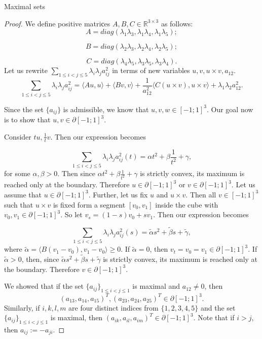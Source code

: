 \documentclass[12pt]{article}
\begin{document}
\begin{section}{Maximal sets}
\begin{proof}
         We define positive matriсes $A,B,C \in \mathbb{R}^{3\times 3}$ as follows:  
        $$
            A = diag(\lambda_{1}\lambda_{3}, \lambda_{1}\lambda_{4},\lambda_{1}\lambda_{5});
        $$ 
        
        $$
            B = diag(\lambda_{2}\lambda_{3}, \lambda_{2}\lambda_{4},\lambda_{2}\lambda_{5});
        $$
        
        $$ 
            C = diag(\lambda_{4}\lambda_{5}, \lambda_{3}\lambda_{5},\lambda_{3}\lambda_{4}).
        $$ 
        Let us rewrite $\sum_{1\leq i < j\leq 5}\lambda_{i}\lambda_{j} a_{ij}^{2}$ in terms of new variables $u,v,u\times v, a_{12}$.
        $$
            \sum_{1\leq i < j\leq 5}\lambda_{i}\lambda_{j} a_{ij}^{2} = \langle Au, u\rangle + \langle Bv, v\rangle + \frac{1}{a_{12}^2}\langle C (u\times v), u\times v\rangle + \lambda_{1}\lambda_{2}a_{12}^2.
        $$
    
        Since the set $\{a_{ij}\}$ is admissible, we know that $u,v,w \in [-1;1]^{3}.$ Our goal now is to show that $u,v \in \partial [-1;1]^{3}.$ 
    
        Consider $tu, \frac{1}{t}v$. Then our expression becomes
    
        $$
            \sum_{1\leq i < j\leq 5}\lambda_{i}\lambda_{j} a_{ij}^{2}(t) = \alpha t^2 + \beta \frac{1}{t^2} + \gamma,
        $$
        for some $\alpha, \beta > 0.$ Then since $\alpha t^2 + \beta \frac{1}{t^2} + \gamma$ is strictly convex, its maximum is reached only  at the boundary. Therefore $u \in \partial [-1;1]^{3}$ or $v \in \partial [-1;1]^{3}.$ Let us assume that $u\in\partial [-1;1]^{3}.$ Further, let us fix $u$ and $u\times v$. Then all $v\in [-1;1]^3$ such that $u\times v$ is fixed form a segment $[v_{0},v_{1}]$ inside the cube with $v_{0},v_{1}\in \partial[-1;1]^{3}.$ So let $v_{s} = (1-s)v_{0} + sv_{1}. $ Then our expression becomes
    
        $$
            \sum_{1\leq i < j\leq 5}\lambda_{i}\lambda_{j} a_{ij}^{2}(s) = \tilde{\alpha} s^2 + \tilde{\beta}s + \tilde{\gamma},
        $$
        where  $\tilde{\alpha} = \langle B(v_{1}-v_{0}), v_{1}-v_{0}\rangle \geq 0. $ If $\tilde{\alpha} = 0$, then $v_{t}=v_{0}=v_{1}\in\partial[-1;1]^{3}$. If $\tilde{\alpha}>0$,  then, since $\tilde{\alpha} s^2 + \tilde{\beta}s + \tilde{\gamma}$ is strictly convex, its maximum is reached only  at the boundary. Therefore $v \in \partial [-1;1]^{3}$.
    
        We showed that if the set $\{a_{ij}\}_{1\leq i < j \leq 1}$ is maximal and $a_{12}\neq 0$, then $$
            (a_{13}, a_{14}, a_{15})^{T}, (a_{23},a_{24},a_{25})^{T} \in \partial [-1;1]^{3}. 
        $$ 
        Similarly, if $i,k,l,m$ are four distinct indices from $\{1,2,3,4,5\}$ and the set $\{a_{ij}\}_{1\leq i < j \leq 1}$ is maximal, then $(a_{ik}, a_{il},a_{im})^{T} \in \partial [-1;1]^{3}$. Note that if $i>j$, then $a_{ij}:=-a_{ji}$.
    

\end{proof}
\end{section}
\end{document}
